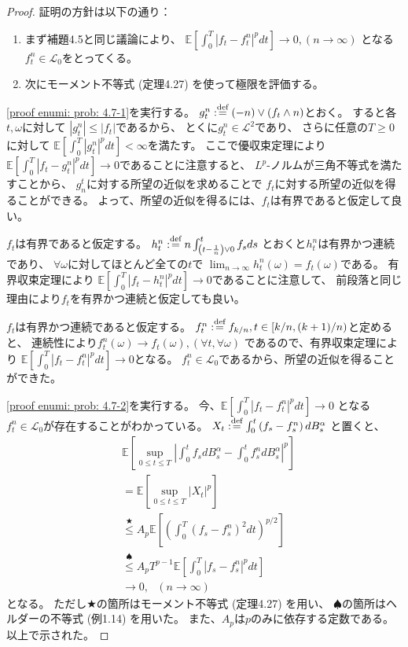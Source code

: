 \documentclass[uplatex]{jsarticle}
\theoremstyle{definition}
\def\E{\mathbb{E}}
\def\mcL{\mathcal{L}}
\def\dfn{:\overset{\mbox{{\scriptsize def}}}{=}}
\begin{document}
\begin{proof}
  証明の方針は以下の通り：
  \begin{enumerate}
    \item \label{proof enumi: prob: 4.7-1}
    まず補題4.5と同じ議論により、
    \(\E\left[ \int_0^T|f_t-f_t^n|^pdt \right]\to 0, (n\to \infty)\)
    となる\(f_t^n\in \mcL_0\)をとってくる。
    \item \label{proof enumi: prob: 4.7-2}
    次にモーメント不等式 (定理4.27) を使って極限を評価する。
  \end{enumerate}

  \ref{proof enumi: prob: 4.7-1}を実行する。
  \(g_t^n \dfn (-n)\vee (f_t\wedge n)\)とおく。
  すると各\(t,\omega\)に対して
  \(|g_t^n| \leq |f_t|\)であるから、
  とくに\(g_t^n\in \mcL^2\)であり、
  さらに任意の\(T\geq 0\)に対して
  \(\E\left[ \int_0^T|g_t^n|^pdt\right] < \infty\)を満たす。
  ここで優収束定理により
  \(\E\left[ \int_0^T|f_t-g_t^n|^pdt\right] \to 0\)であることに注意すると、
  \(L^p\)-ノルムが三角不等式を満たすことから、
  \(g_n^t\)に対する所望の近似を求めることで
  \(f_t\)に対する所望の近似を得ることができる。
  よって、所望の近似を得るには、\(f_t\)は有界であると仮定して良い。

  \(f_t\)は有界であると仮定する。
  \(h_t^n \dfn n\int_{\left(t-\frac{1}{n}\right)\vee 0}^t f_sds\)
  とおくと\(h_t^n\)は有界かつ連続であり、
  \(\forall \omega\)に対してほとんど全ての\(t\)で
  \(\lim_{n\to \infty}h_t^n(\omega) = f_t(\omega)\)である。
  有界収束定理により
  \(\E\left[ \int_0^T|f_t-h_t^n|^pdt\right] \to 0\)であることに注意して、
  前段落と同じ理由により\(f_t\)を有界かつ連続と仮定しても良い。

  \(f_t\)は有界かつ連続であると仮定する。
  \(f_t^n \dfn f_{k/n}, t\in [k/n,(k+1)/n)\)と定めると、
  連続性により\(f_t^n(\omega)\to f_t(\omega) , (\forall t,\forall \omega)\)
  であるので、有界収束定理により
  \(\E\left[ \int_0^T|f_t-f_t^n|^pdt\right] \to 0\)となる。
  \(f_t^n\in \mcL_0\)であるから、所望の近似を得ることができた。

  \ref{proof enumi: prob: 4.7-2}を実行する。
  今、\(\E\left[ \int_0^T|f_t-f_t^n|^pdt\right] \to 0\)
  となる\(f_t^n\in \mcL_0\)が存在することがわかっている。
  \(X_t \dfn \int_0^t\left( f_s - f_s^n\right) dB_s^\alpha\)
  と置くと、
  \begin{align*}
    &\E\left[ \sup_{0\leq t\leq T}\left|
    \int_0^tf_sdB_s^\alpha - \int_0^tf_s^ndB_s^\alpha \right|^p\right] \\
    &= \E\left[ \sup_{0\leq t\leq T}\left| X_t\right|^p \right] \\
    &\overset{\bigstar}{\leq} A_p \E\left[ \left(
    \int_0^T\left( f_s - f_s^n\right)^2dt \right)^{p/2}\right] \\
    &\overset{\spadesuit}{\leq} A_pT^{p-1} \E\left[
    \int_0^T\left| f_s - f_s^n\right|^pdt \right] \\
    &\to 0 , \ \ \ (n\to\infty)
  \end{align*}
  となる。
  ただし\(\bigstar\)の箇所はモーメント不等式 (定理4.27) を用い、
  \(\spadesuit\)の箇所はヘルダーの不等式 (例1.14) を用いた。
  また、\(A_p\)は\(p\)のみに依存する定数である。
  以上で示された。
\end{proof}
\end{document}

